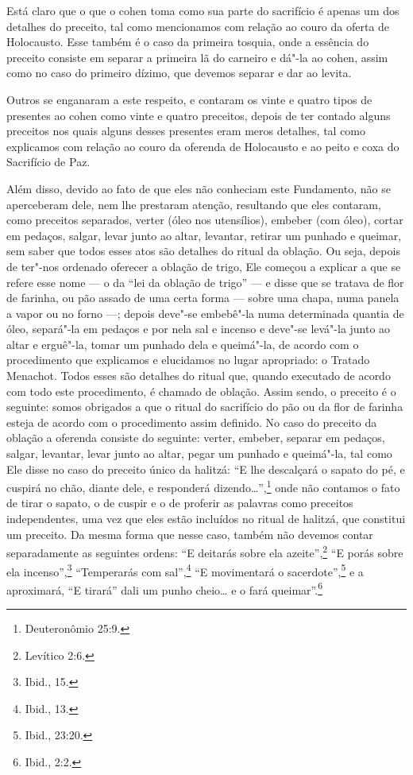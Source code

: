 Está claro que o que o cohen\starr{} toma como sua parte do sacrifício é
apenas um dos detalhes do preceito, tal como mencionamos com relação ao
couro da oferta de Holocausto. Esse também é o caso da primeira tosquia,
onde a essência do preceito consiste em separar a primeira lã do
carneiro e dá"-la ao cohen\starr, assim como no caso do primeiro dízimo,
que devemos separar e dar ao levita\starr.

Outros se enganaram a este respeito, e contaram os vinte e quatro tipos
de presentes ao cohen\starr{} como vinte e quatro preceitos, depois de ter
contado alguns preceitos nos quais alguns desses presentes eram meros
detalhes, tal como explicamos com relação ao couro da oferenda de
Holocausto e ao peito e coxa do Sacrifício de Paz.

Além disso, devido ao fato de que eles não conheciam este Fundamento,
não se aperceberam dele, nem lhe prestaram atenção, resultando que eles
contaram, como preceitos separados, verter (óleo nos utensílios),
embeber (com óleo), cortar em pedaços, salgar, levar junto ao altar,
levantar, retirar um punhado e queimar, sem saber que todos esses atos
são detalhes do ritual da oblação. Ou seja, depois de ter"-nos ordenado
oferecer a oblação de trigo, Ele começou a explicar a que se refere esse
nome --- o da ``lei da oblação de trigo'' --- e disse que se tratava de
flor de farinha, ou pão assado de uma certa forma --- sobre uma chapa,
numa panela a vapor ou no forno ---; depois deve"-se embebê"-la numa
determinada quantia de óleo, separá"-la em pedaços e por nela sal e
incenso e deve"-se levá"-la junto ao altar e erguê"-la, tomar um punhado
dela e queimá"-la, de acordo com o procedimento que explicamos e
elucidamos no lugar apropriado: o Tratado Menachot\starr. Todos esses são
detalhes do ritual que, quando executado de acordo com todo este
procedimento, é chamado de oblação. Assim sendo, o preceito é o
seguinte: somos obrigados a que o ritual do sacrifício do pão ou da flor
de farinha esteja de acordo com o procedimento assim definido. No caso
do preceito da oblação a oferenda consiste do seguinte: verter,
embeber, separar em pedaços, salgar, levantar, levar junto ao altar,
pegar um punhado e queimá"-la, tal como Ele disse no caso do preceito
único da halitzá\starr: ``E lhe descalçará o sapato do pé, e cuspirá no
chão, diante dele, e responderá dizendo\ldots{}'',\footnote{Deuteronômio 25:9.} onde
não contamos o fato de tirar o sapato, o de cuspir e o de proferir as
palavras como preceitos independentes, uma vez que eles estão incluídos
no ritual de halitzá\starr, que constitui um preceito. Da mesma forma que
nesse caso, também não devemos contar separadamente as seguintes ordens:
``E deitarás sobre ela azeite'',\footnote{Levítico 2:6.} ``E porás sobre ela
incenso'',\footnote{Ibid., 15.} ``Temperarás com sal'',\footnote{Ibid., 13.} ``E
movimentará o sacerdote'',\footnote{Ibid., 23:20.} e a aproximará, ``E tirará''
dali um punho cheio\ldots{} e o fará queimar''.\footnote{Ibid., 2:2.}

